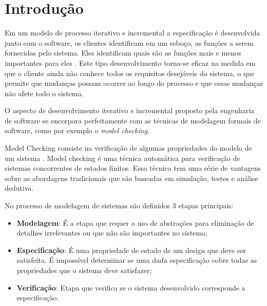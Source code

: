 
\section{Introdução}


Em um modelo de processo iterativo e incremental a especificação é desenvolvida junto com o software, os clientes identificam em um esboço, as funções a serem fornecidas pelo sistema. Eles identificam quais são as funções mais e menos importantes para eles \cite{sommerville2011engenharia}.
Este tipo desenvolvimento torna-se eficaz na medida em que o cliente ainda não conhece todos os requisitos desejáveis do sistema, o que permite que mudanças possam ocorrer ao longo do processo e que essas mudanças não afete todo o sistema.

O aspecto de desenvolvimento iterativo e incremental proposto pela engenharia de software se encorpora perfeitamente com as técnicas de modelagem formais de software, como por exemplo o \textit{model checking}.

Model Checking consiste na verificação de algumas propriedades do modelo de um sistema \cite{Berard:2010:SSV:1965314}. Model checking é uma técnica automática para verificação de sistemas concorrentes de estados finitos. Essa técnica tem uma série de vantagens sobre as abordagens tradicionais que são baseadas em simulação, testes e análise dedutiva\cite{clarke1999model}.

No processo de modelagem de sistemas são definidos 3 etapas principais:
\begin{itemize}
\item \textbf{Modelagem}: É a etapa que requer o uso de abstrações para eliminação de detalhes irrelevantes ou que não são importantes no sistema;

\item \textbf{Especificação}: É uma propriedade de estado de um design que deve ser satisfeita. É impossível determinar se uma dada especificação cobre todas as propriedades que o sistema deve satisfazer; %

\item \textbf{Verificação}: Etapa que verifica se o sistema desenvolvido corresponde a especificação.
\end{itemize}

